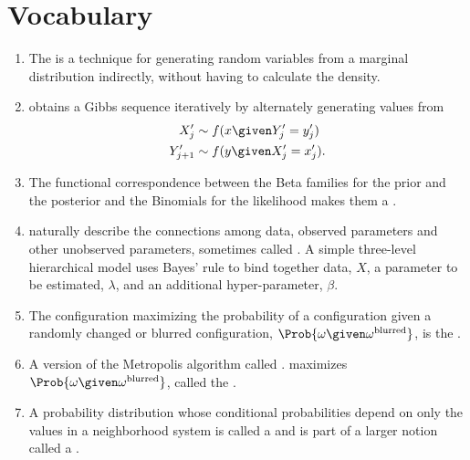 \documentclass[12pt]{article}
\begin{document}
\section*{Vocabulary}
\begin{enumerate}
    \item
        The  is a technique for generating random
        variables from a marginal distribution%
        indirectly, without having to calculate the density.
    \item
         obtains a Gibbs sequence iteratively by
        alternately generating values from
        \begin{align*}
            X'_j &\sim f(x \given Y'_j = y'_j) \\
            Y'_{j+1} &\sim f(y \given X'_j = x'_j).
        \end{align*}
    \item
        The functional correspondence between the Beta families for the
        prior and the posterior and the Binomials for the likelihood
        makes them a .%
    \item
         naturally describe the
        connections among data, observed parameters and other unobserved
        parameters, sometimes called . A simple
        three-level hierarchical model uses Bayes' rule to bind together
        data, \( X \), a parameter to be estimated, \( \lambda \), and
        an additional hyper-parameter, \( \beta \).
    \item
        The configuration maximizing the probability of a configuration
        given a randomly changed or blurred configuration, \( \Prob{\omega
        \given \omega^{\text{blurred}}} \), is the .
    \item
        A version of the Metropolis algorithm called .  maximizes \( \Prob{\omega \given \omega^{\text{blurred}}}
        \), called the .
    \item
        A probability distribution whose conditional probabilities
        depend on only the values in a neighborhood system is called a
         and is part of a larger notion called
        a .
\end{enumerate}
\end{document}
